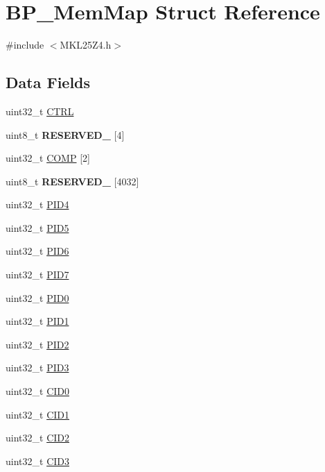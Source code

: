 \hypertarget{struct_b_p___mem_map}{}\section{B\+P\+\_\+\+Mem\+Map Struct Reference}
\label{struct_b_p___mem_map}


{\ttfamily \#include $<$M\+K\+L25\+Z4.\+h$>$}

\subsection*{Data Fields}
\begin{DoxyCompactItemize}
\item 
uint32\+\_\+t \hyperlink{struct_b_p___mem_map_adc78a44bcbb6564277efefa8f07439ce}{C\+T\+RL}
\item 
\mbox{\label{struct_b_p___mem_map_aeec0c0802a6643ff1423787e429c4b77}} 
uint8\+\_\+t {\bfseries R\+E\+S\+E\+R\+V\+E\+D\+\_} \mbox{[}4\mbox{]}
\item 
uint32\+\_\+t \hyperlink{struct_b_p___mem_map_ac8c266a109ad2f29683dfb7873b71974}{C\+O\+MP} \mbox{[}2\mbox{]}
\item 
\mbox{\label{struct_b_p___mem_map_a72d853a7f23eb2aa5e1c285f1f022449}} 
uint8\+\_\+t {\bfseries R\+E\+S\+E\+R\+V\+E\+D\+\_} \mbox{[}4032\mbox{]}
\item 
uint32\+\_\+t \hyperlink{struct_b_p___mem_map_a1e7c67c7222aedc5a3c16c5560748793}{P\+I\+D4}
\item 
uint32\+\_\+t \hyperlink{struct_b_p___mem_map_abb77e60e581e55fe33af44ebf1030116}{P\+I\+D5}
\item 
uint32\+\_\+t \hyperlink{struct_b_p___mem_map_a9f611c760b2dc672f72485a6751ae703}{P\+I\+D6}
\item 
uint32\+\_\+t \hyperlink{struct_b_p___mem_map_a60dff3ca8ab0f81ef166fffd7fbc3356}{P\+I\+D7}
\item 
uint32\+\_\+t \hyperlink{struct_b_p___mem_map_acb1de7fb15f421c81ddfbf6feba0c4f2}{P\+I\+D0}
\item 
uint32\+\_\+t \hyperlink{struct_b_p___mem_map_a2b27e33fff1d3730366050ede44cb7c3}{P\+I\+D1}
\item 
uint32\+\_\+t \hyperlink{struct_b_p___mem_map_a76e6da948034b317948bbe7b794b02c6}{P\+I\+D2}
\item 
uint32\+\_\+t \hyperlink{struct_b_p___mem_map_a556f1775a26cc79e8ab97c8452ce2c41}{P\+I\+D3}
\item 
uint32\+\_\+t \hyperlink{struct_b_p___mem_map_a533b8c0657ac258f340baaea96ecc00c}{C\+I\+D0}
\item 
uint32\+\_\+t \hyperlink{struct_b_p___mem_map_aecbf01d7c8fd4689e6ede5b9c12b3d94}{C\+I\+D1}
\item 
uint32\+\_\+t \hyperlink{struct_b_p___mem_map_a3900abf0b057f791c7fe66a79862f837}{C\+I\+D2}
\item 
uint32\+\_\+t \hyperlink{struct_b_p___mem_map_a26076f956d1700acaeb0c9db60846606}{C\+I\+D3}
\end{DoxyCompactItemize}


